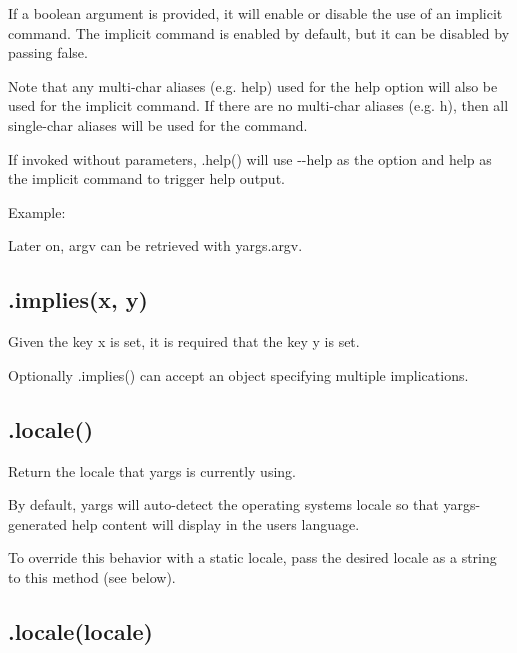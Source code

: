 If a boolean argument is provided, it will enable or disable the use of an implicit command. The implicit command is enabled by default, but it can be disabled by passing {\ttfamily false}.

Note that any multi-\/char aliases (e.\+g. {\ttfamily help}) used for the help option will also be used for the implicit command. If there are no multi-\/char aliases (e.\+g. {\ttfamily h}), then all single-\/char aliases will be used for the command.

If invoked without parameters, {\ttfamily .help()} will use {\ttfamily -\/-\/help} as the option and {\ttfamily help} as the implicit command to trigger help output.

Example\+:




Later on, {\ttfamily argv} can be retrieved with {\ttfamily yargs.\+argv}.

\subsection*{\label{_implies}%
.implies(x, y) }

Given the key {\ttfamily x} is set, it is required that the key {\ttfamily y} is set.

Optionally {\ttfamily .implies()} can accept an object specifying multiple implications.

\subsection*{.locale() }

Return the locale that yargs is currently using.

By default, yargs will auto-\/detect the operating system\textquotesingle{}s locale so that yargs-\/generated help content will display in the user\textquotesingle{}s language.

To override this behavior with a static locale, pass the desired locale as a string to this method (see below).

\subsection*{.locale(locale) }

